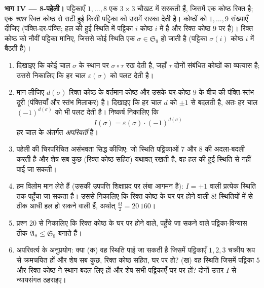 \begin{problem}
\medskip \noindent\textbf{भाग IV --- 8-पहेली।} पट्टिकाएँ $1, \dots, 8$ एक $3
\times 3$ चौखट में सरकती हैं, जिसमें एक कोष्ठ रिक्त है; एक \emph{चाल} रिक्त
कोष्ठ से सटी हुई किसी पट्टिका को उसमें सरका देती है। कोष्ठों को $1, \dots,
9$ संख्याएँ दीजिए (पंक्ति-दर-पंक्ति; हल की हुई स्थिति में पट्टिका $i$ कोष्ठ
$i$ में है और रिक्त कोष्ठ $9$ पर है)। रिक्त कोष्ठ को नौवीं पट्टिका मानिए,
जिससे कोई स्थिति एक  $\sigma \in \mathfrak S_9$ हो जाती है (पट्टिका
$\sigma(i)$ कोष्ठ $i$ में बैठती है)।
\begin{enumerate}[resume]
  \item दिखाइए कि कोई चाल $\sigma$ के स्थान पर $\sigma \circ \tau$ रख देती
  है, जहाँ $\tau$ दोनों संबंधित कोष्ठों का व्यत्यास है; उससे निकालिए कि हर
  चाल $\varepsilon(\sigma)$ को पलट देती है।
  \item मान लीजिए $d(\sigma)$ रिक्त कोष्ठ के वर्तमान कोष्ठ और उसके घर-कोष्ठ
  $9$ के बीच की पंक्ति-स्तंभ दूरी (पंक्तियाँ और स्तंभ मिलाकर) है। दिखाइए कि
  हर चाल $d$ को $\pm1$ से बदलती है, अतः हर चाल $(-1)^{d(\sigma)}$ को भी पलट
  देती है। निष्कर्ष निकालिए कि
        \[
        I(\sigma) = \varepsilon(\sigma)\cdot(-1)^{d(\sigma)}
        \]
        हर चाल के अंतर्गत \emph{अपरिवर्ती} है।
  \item पहेली की चिरपरिचित असंभवता सिद्ध कीजिए: जो स्थिति पट्टिकाओं $7$ और
  $8$ की अदला-बदली करती है और शेष सब कुछ (रिक्त कोष्ठ सहित) यथावत् रखती है,
  वह हल की हुई स्थिति से नहीं पाई जा सकती।
  \item हम विलोम मान लेते हैं (उसकी उपपत्ति शिक्षाप्रद पर लंबा आगमन है): $I
  = +1$ वाली प्रत्येक स्थिति तक पहुँचा जा सकता है। उससे निकालिए कि रिक्त
  कोष्ठ के घर पर होने वाली $8!$ स्थितियों में से ठीक आधी हल हो सकने वाली
  हैं, अर्थात् $\frac{8!}2 = 20\,160$।
  \item प्रश्न 20 से निकालिए कि रिक्त कोष्ठ के घर पर होने वाले, पहुँचे जा
  सकने वाले पट्टिका-विन्यास ठीक  $\mathfrak A_8 \leq \mathfrak S_8$
  बनाते हैं।
  \item अपरिवर्त्य के अनुप्रयोग: क्या (क) वह स्थिति पाई जा सकती है जिसमें
  पट्टिकाएँ $1, 2, 3$ चक्रीय रूप से क्रमचयित हों और शेष सब कुछ, रिक्त कोष्ठ
  सहित, घर पर हो? (ख) वह स्थिति जिसमें पट्टिका $5$ और रिक्त कोष्ठ ने स्थान
  बदल लिए हों और शेष सभी पट्टिकाएँ घर पर हों? दोनों उत्तर $I$ से न्यायसंगत
  ठहराइए।
\end{enumerate}


\end{problem}
